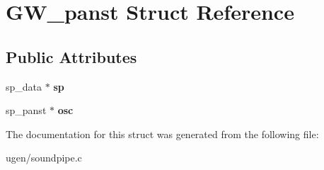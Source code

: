 \hypertarget{structGW__panst}{}\section{G\+W\+\_\+panst Struct Reference}
\label{structGW__panst}
\subsection*{Public Attributes}
\begin{DoxyCompactItemize}
\item 
\hypertarget{structGW__panst_ad4b49523fa18b804c0b6d6047e052855}{}\label{structGW__panst_ad4b49523fa18b804c0b6d6047e052855} 
sp\+\_\+data $\ast$ {\bfseries sp}
\item 
\hypertarget{structGW__panst_a12a8926d447ac81dd9901525265d14f6}{}\label{structGW__panst_a12a8926d447ac81dd9901525265d14f6} 
sp\+\_\+panst $\ast$ {\bfseries osc}
\end{DoxyCompactItemize}


The documentation for this struct was generated from the following file\+:\begin{DoxyCompactItemize}
\item 
ugen/soundpipe.\+c\end{DoxyCompactItemize}
